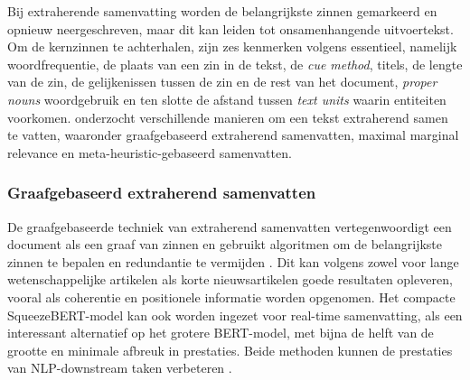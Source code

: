 Bij extraherende samenvatting worden de belangrijkste zinnen gemarkeerd en opnieuw neergeschreven, maar dit kan leiden tot onsamenhangende uitvoertekst. Om de kernzinnen te achterhalen, zijn zes kenmerken volgens \textcite{Khan2014} essentieel, namelijk woordfrequentie, de plaats van een zin in de tekst, de \textit{cue method}, titels, de lengte van de zin, de gelijkenissen tussen de zin en de rest van het document, \textit{proper nouns} woordgebruik en ten slotte de afstand tussen \textit{text units} waarin entiteiten voorkomen. \textcite{Verma2020} onderzocht verschillende manieren om een tekst extraherend samen te vatten, waaronder graafgebaseerd extraherend samenvatten, maximal marginal relevance en meta-heuristic-gebaseerd samenvatten.


\subsubsection{Graafgebaseerd extraherend samenvatten}

De graafgebaseerde techniek van extraherend samenvatten vertegenwoordigt een document als een graaf van zinnen en gebruikt algoritmen om de belangrijkste zinnen te bepalen en redundantie te vermijden \autocite{Parveen2015}. Dit kan volgens \textcite{Parveen2015} zowel voor lange wetenschappelijke artikelen als korte nieuwsartikelen goede resultaten opleveren, vooral als coherentie en positionele informatie worden opgenomen. Het compacte SqueezeBERT-model kan ook worden ingezet voor real-time samenvatting, als een interessant alternatief op het grotere BERT-model, met bijna de helft van de grootte en minimale afbreuk in prestaties. Beide methoden kunnen de prestaties van NLP-downstream taken verbeteren \autocite{AbdelSalam2022}.

